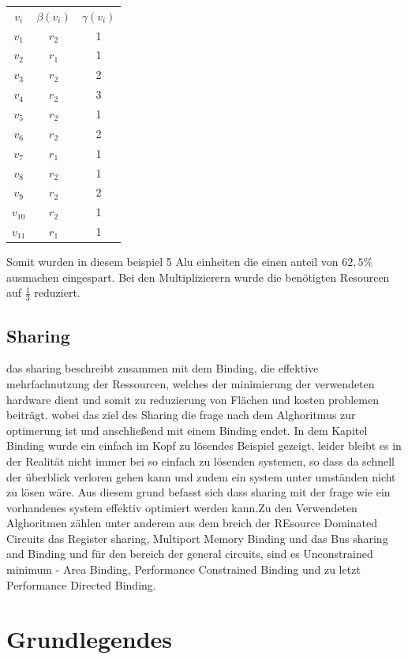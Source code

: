 \documentclass[conference]{IEEEtran}
\begin{document}
\begin{center}
\begin{tabular}[h]{ccc}
$v_i$&$\beta(v_i)$&$\gamma(v_i)$\\
$v_1$&$r_2$&1\\
$v_2$&$r_1$&1\\
$v_3$&$r_2$&2\\
$v_4$&$r_2$&3\\
$v_5$&$r_2$&1\\
$v_6$&$r_2$&2\\
$v_7$&$r_1$&1\\
$v_8$&$r_2$&1\\
$v_9$&$r_2$&2\\
$v_10$&$r_2$&1\\
$v_11$&$r_1$&1\\
\end{tabular}
\end{center}
Somit wurden in diesem beispiel 5 Alu einheiten die einen anteil von $62,5\%$ ausmachen eingespart. Bei den Multiplizierern wurde die benötigten Resourcen auf $\frac{1}{3}$ reduziert.


\subsection{Sharing}
das sharing beschreibt zusammen mit dem Binding,  die effektive mehrfachnutzung der Ressourcen, welches der minimierung der verwendeten hardware dient und somit zu reduzierung von Flächen und kosten problemen beiträgt. wobei das ziel des Sharing die frage nach dem Alghoritmus zur optimerung ist und anschließend mit einem Binding endet. In dem Kapitel Binding wurde ein einfach im Kopf zu lösendes Beispiel gezeigt, leider bleibt es in der Realität nicht immer bei so einfach zu lösenden systemen, so dass da schnell der überblick verloren gehen kann und zudem ein system unter umständen nicht zu lösen wäre. Aus diesem grund befasst sich dass sharing mit der frage wie ein vorhandenes system effektiv optimiert werden kann.Zu den Verwendeten Alghoritmen zählen unter anderem aus dem breich der REsource Dominated Circuits das Register sharing, Multiport Memory Binding und das Bus sharing and Binding und für den bereich der general circuits, sind es Unconstrained minimum - Area Binding, Performance Constrained Binding und zu letzt Performance Directed Binding.   
\section{Grundlegendes}
\end{document}
